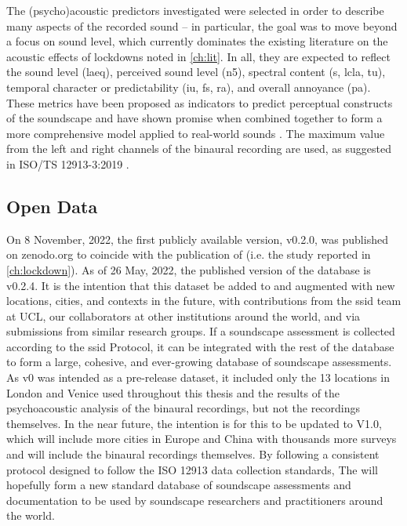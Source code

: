    The (psycho)acoustic predictors investigated were selected in order to describe many aspects of the recorded sound -- in particular, the goal was to move beyond a focus on sound level, which currently dominates the existing literature on the acoustic effects of lockdowns noted in \cref{ch:lit}. In all, they are expected to reflect the sound level (\gls{laeq}), perceived sound level (\gls{n5}), spectral content (\gls{s}, \gls{lcla}, \gls{tu}), temporal character or predictability (\gls{iu}, \gls{fs}, \gls{ra}), and overall annoyance (\gls{pa}). These metrics have been proposed as indicators to predict perceptual constructs of the soundscape \citep{Aletta2017Dimensions, Aletta2016Soundscape} and have shown promise when combined together to form a more comprehensive model applied to real-world sounds \citep{Orga2021Multilevel}. The maximum value from the left and right channels of the binaural recording are used, as suggested in ISO/TS 12913-3:2019 \citep{ISO12913Part3}.


\subsection{Open Data}
On 8 November, 2022, the first publicly available version, v0.2.0, was published on zenodo.org to coincide with the publication of \citet{Mitchell2021Investigating} (i.e. the study reported in \cref{ch:lockdown}). As of 26 May, 2022, the published version of the database is v0.2.4. It is the intention that this dataset be added to and augmented with new locations, cities, and contexts in the future, with contributions from the \gls{ssid} team at UCL, our collaborators at other institutions around the world, and via submissions from similar research groups. If a soundscape assessment is collected according to the \gls{ssid} Protocol, it can be integrated with the rest of the database to form a large, cohesive, and ever-growing database of soundscape assessments. As v0 was intended as a pre-release dataset, it included only the 13 locations in London and Venice used throughout this thesis and the results of the psychoacoustic analysis of the binaural recordings, but not the recordings themselves. In the near future, the intention is for this to be updated to V1.0, which will include more cities in Europe and China with thousands more surveys and will include the binaural recordings themselves. By following a consistent protocol designed to follow the ISO 12913 data collection standards, The  \citep{Mitchell2021International} will hopefully form a new standard database of soundscape assessments and documentation to be used by soundscape researchers and practitioners around the world.


